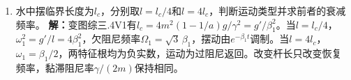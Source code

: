 \documentclass[UTF8,fontset=fandol,a4paper,11pt]{ctexart}
\begin{document}
\begin{enumerate}
\item 水中摆临界长度为$l_c$，分别取$l=l_c/4$和$l=4l_c$，判断运动类型并求前者的衰减频率。
\textbf{解：}变图综三.4V1有$l_c=4m^2(1-1/a)g/\gamma^2=g'/\beta_1^2$。当$l=l_c/4$，$\omega_1^2=g'/l=4\beta_1^2$，欠阻尼频率$\Omega_1=\sqrt3\,\beta_1$，摆动由$e^{-\beta_1t}$调制。当$l=4l_c$，$\omega_1=\beta_1/2$，两特征根均为负实数，运动为过阻尼返回。改变杆长只改变恢复频率，黏滞阻尼率$\gamma/(2m)$保持相同。
\begin{center}\begin{minipage}{.98\linewidth}\centering
{}
\end{minipage}
\end{center}
\end{enumerate}
\end{document}
